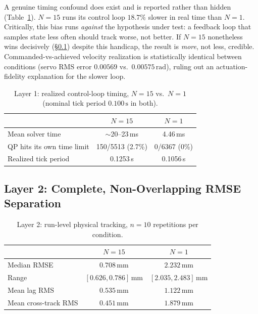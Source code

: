 \documentclass[11pt]{article}
\begin{document}
A genuine timing confound does exist and is reported rather than
hidden (Table~\ref{tab:timing}). $N{=}15$ runs its control loop
$18.7\%$ slower in real time than $N{=}1$. Critically, this bias runs
\emph{against} the hypothesis under test: a feedback loop that samples
state less often should track worse, not better. If $N{=}15$
nonetheless wins decisively (\S\ref{sec:ph-layer2}) despite this
handicap, the result is \emph{more}, not less, credible.
Commanded-vs-achieved velocity realization is statistically identical
between conditions (servo RMS error $0.00569$ vs.\
$0.00575\,\mathrm{rad}$), ruling out an actuation-fidelity explanation
for the slower loop.

\begin{table}[h]
\centering
\caption{Layer 1: realized control-loop timing, $N{=}15$ vs.\ $N{=}1$ (nominal tick period $0.100\,\mathrm{s}$ in both).}
\label{tab:timing}
\begin{tabular}{@{}lcc@{}}
\toprule
 & $N{=}15$ & $N{=}1$ \\
\midrule
Mean solver time & $\sim$20--23\,ms & 4.46\,ms \\
QP hits its own time limit & 150/5513 (2.7\%) & 0/6367 (0\%) \\
Realized tick period & 0.1253\,s & 0.1056\,s \\
\bottomrule
\end{tabular}
\end{table}

\subsection{Layer 2: Complete, Non-Overlapping RMSE Separation}
\label{sec:ph-layer2}

\begin{table}[h]
\centering
\caption{Layer 2: run-level physical tracking, $n{=}10$ repetitions per condition.}
\label{tab:rmse}
\begin{tabular}{@{}lcc@{}}
\toprule
 & $N{=}15$ & $N{=}1$ \\
\midrule
Median RMSE & $0.708\,\mathrm{mm}$ & $2.232\,\mathrm{mm}$ \\
Range & $[0.626,0.786]\,\mathrm{mm}$ & $[2.035,2.483]\,\mathrm{mm}$ \\
Mean lag RMS & $0.535\,\mathrm{mm}$ & $1.122\,\mathrm{mm}$ \\
Mean cross-track RMS & $0.451\,\mathrm{mm}$ & $1.879\,\mathrm{mm}$ \\
\bottomrule
\end{tabular}
\end{table}
\end{document}
